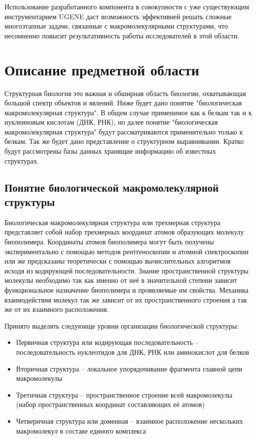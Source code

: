 \documentclass[a4paper, 12pt, titlepage, utf8]{extarticle}
\let\oldsection\section         %
\renewcommand{\section}{\newpage\oldsection}
\begin{document}
Использование разработанного компонента в совокупности с уже существующим инструментарием UGENE даст возможность эффективней решать сложные многоэтапные задачи, связанные с макромолекулярными структурами, что несомненно повысит результативность работы исследователей в этой области.


\section{Описание предметной области}	%
Структурная биология это важная и обширная область биологии, охватывающая большой спектр объектов и явлений. Ниже будет дано понятие "биологическая макромолекулярная структура". В общем случае применимое как к белкам так и к нуклеиновым кислотам (ДНК, РНК), но далее понятие "биологическая макромолекулярная структура" будут рассматриваются применительно только к белкам. Так же будет дано представление о структурном выравнивании. Кратко будут рассмотрены базы данных хранящие информацию об известных структурах. 

\subsection{Понятие биологической макромолекулярной структуры}
Биологическая макромолекулярная структура или трехмерная структура представляет собой набор трехмерных координат атомов образующих молекулу биополимера. Координаты атомов биополимера могут быть получены экспериментально с помощью методов рентгеноскопии и атомной спектроскопии или же предсказаны теоретически с помощью вычислительных алгоритмов исходя из кодирующей последовательности. Знание пространственной структуры молекулы необходимо так как именно от неё в значительной степени зависит функциональное назначение биополимера и проявляемые им свойства. Механика взаимодействия молекул так же зависит от их пространственного строения а так же от их взаимного расположения. 

Принято выделять следуюище уровни организации биологической структуры:
\begin{itemize}
    \item Первичная структура или кодирующая последовательность -- последовательность нуклеотидов для ДНК, РНК или аминокислот для белков
    \item Вторичная структура -- локальное упорядочивание фрагмента главной цепи макромолекулы
    \item Третичная структура -- пространственное строение всей макромолекулы (набор пространственных координат составляющих её атомов)    
    \item Четверичная структура или доменная -- взаимное расположение нескольких макромолекул в составе единого комплекса
\end{itemize}
\end{document}
